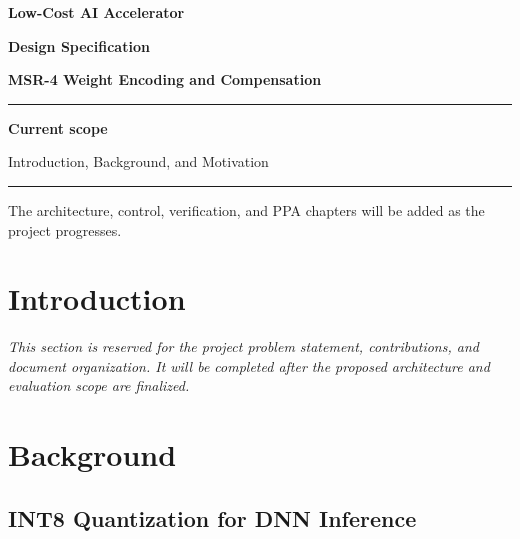 \documentclass[12pt,a4paper]{report}
\begin{document}
\pagestyle{plain}

\begin{titlepage}
\centering
\vspace*{3cm}
{\fontsize{28}{34}\selectfont\bfseries Low-Cost AI Accelerator\par}
\vspace{0.6em}
{\fontsize{20}{26}\selectfont\bfseries Design Specification\par}
\vspace{0.4em}
{\fontsize{16}{22}\selectfont\bfseries MSR-4 Weight Encoding and Compensation\par}

\vspace{1.5cm}
\textcolor{crimson}{\rule{0.6\linewidth}{1.2pt}}\par
\vspace{1.5cm}

{\large\bfseries Current scope}\par
\vspace{0.4em}
{\large Introduction, Background, and Motivation}\par

\vfill
\textcolor{crimson}{\rule{0.6\linewidth}{0.6pt}}\par
\vspace{0.5em}
{\small The architecture, control, verification, and PPA chapters will be added as the project progresses.}\par
\end{titlepage}

\tableofcontents
\newpage

\chapter{Introduction}
\label{ch:introduction}

\textit{This section is reserved for the project problem statement, contributions, and document organization. It will be completed after the proposed architecture and evaluation scope are finalized.}

\chapter{Background}
\label{ch:background}

\section{INT8 Quantization for DNN Inference}
\end{document}

